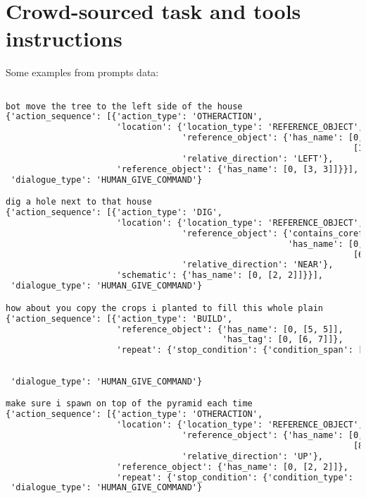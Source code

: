 \clearpage
\onecolumn

\lstset{
basicstyle=\small\ttfamily,
columns=flexible,
breaklines=true
}

\section{Crowd-sourced task and tools instructions}
\label{sec:dataset_examples}

Some examples from prompts data:

\begin{lstlisting}[language=TeX]

bot move the tree to the left side of the house
{'action_sequence': [{'action_type': 'OTHERACTION',
                      'location': {'location_type': 'REFERENCE_OBJECT',
                                   'reference_object': {'has_name': [0,
                                                                     [10, 10]]},
                                   'relative_direction': 'LEFT'},
                      'reference_object': {'has_name': [0, [3, 3]]}}],
 'dialogue_type': 'HUMAN_GIVE_COMMAND'}

dig a hole next to that house
{'action_sequence': [{'action_type': 'DIG',
                      'location': {'location_type': 'REFERENCE_OBJECT',
                                   'reference_object': {'contains_coreference': 'yes',
                                                        'has_name': [0,
                                                                     [6, 6]]},
                                   'relative_direction': 'NEAR'},
                      'schematic': {'has_name': [0, [2, 2]]}}],
 'dialogue_type': 'HUMAN_GIVE_COMMAND'}

how about you copy the crops i planted to fill this whole plain
{'action_sequence': [{'action_type': 'BUILD',
                      'reference_object': {'has_name': [0, [5, 5]],
                                           'has_tag': [0, [6, 7]]},
                      'repeat': {'stop_condition': {'condition_span': [0,
                                                                       [9,
                                                                        12]]}}}],
 'dialogue_type': 'HUMAN_GIVE_COMMAND'}

make sure i spawn on top of the pyramid each time
{'action_sequence': [{'action_type': 'OTHERACTION',
                      'location': {'location_type': 'REFERENCE_OBJECT',
                                   'reference_object': {'has_name': [0,
                                                                     [8, 8]]},
                                   'relative_direction': 'UP'},
                      'reference_object': {'has_name': [0, [2, 2]]},
                      'repeat': {'stop_condition': {'condition_type': 'NEVER'}}}],
 'dialogue_type': 'HUMAN_GIVE_COMMAND'}


\end{lstlisting}
